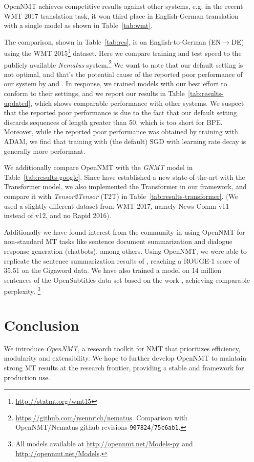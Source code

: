 \documentclass[]{article}
\begin{document}
OpenNMT achieves competitive results against other systems, e.g. in the recent WMT 2017 translation task, it won third place in English-German translation with a single model as shown in Table~\ref{tab:wmt}.  


The comparison, shown in Table~\ref{tab:res}, is on English-to-German
(EN$\rightarrow$DE) using the WMT
2015\footnote{\url{http://statmt.org/wmt15}} dataset. Here we compare training and test speed to the publicly
available \textit{Nematus} system.\footnote{\url{https://github.com/rsennrich/nematus}. Comparison with
  OpenNMT/Nematus github revisions {\tt 907824}/{\tt 75c6ab1}.} We want to note that our default setting is not optimal, and that's the potential cause of the reported poor performance of our system by \cite{britz2017massive} and \cite{hieber2017sockeye}. In response, we trained models with our best effort to conform to their settings, and we report our results in Table~\ref{tab:results-updated}, which shows comparable performance with other systems. We suspect that the reported poor performance is due to the fact that our default setting discards sequences of length greater than 50, which is too short for BPE. Moreover, while the reported poor performance was obtained by training with ADAM, we find that training with (the default) SGD with learning rate decay is generally more performant. 

We additionally compare OpenNMT with the \textit{GNMT} \citep{wu2016google} model in Table~\ref{tab:results-google}. 
Since \cite{vaswani2017attention} have established a new state-of-the-art with the Transformer model, we also implemented the Transformer in our framework, and compare it with \textit{Tensor2Tensor} (T2T) in Table~\ref{tab:results-transformer}. (We used a slightly different dataset from WMT 2017, namely News Comm v11 instead of v12, and no Rapid 2016).

Additionally we have found interest from the community in using
OpenNMT for non-standard MT tasks like sentence document summarization and
dialogue response generation (chatbots), among others.  Using
OpenNMT, we were able to replicate the sentence summarization results
of \citet{chopra2016abstractive}, reaching a ROUGE-1 score of 35.51 on
the Gigaword data. We have also trained a model on 14 million
sentences of the OpenSubtitles data set based on the work
\citet{vinyals2015neural}, achieving comparable perplexity. \footnote{All models available at \url{http://opennmt.net/Models-py} and \url{http://opennmt.net/Models}.}



\section{Conclusion}

We introduce \textit{OpenNMT}, a research toolkit for NMT that
prioritizes efficiency, modularity and extensibility. We hope to further develop
OpenNMT to maintain strong MT results at the research frontier,
providing a stable and framework for production use.
\newpage
\small



\end{document}
